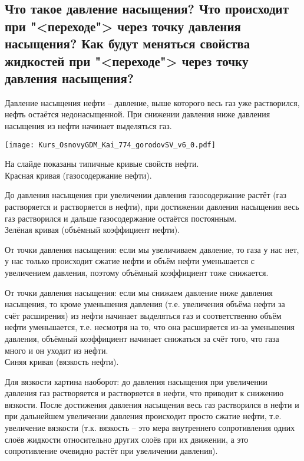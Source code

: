 

\subsection{Что такое давление насыщения? Что происходит при "<переходе"> через точку давления насыщения? Как будут меняться свойства жидкостей при "<переходе"> через  точку давления насыщения?}

Давление насыщения нефти -- давление, выше которого весь газ уже растворился, нефть остаётся недонасыщенной.
При снижении давления ниже давления насыщения из нефти начинает выделяться газ.

\texttt{[image: Kurs\_OsnovyGDM\_Kai\_774\_gorodovSV\_v6\_0.pdf]}

На слайде показаны типичные кривые свойств нефти.
\\

Красная кривая (газосодержание нефти).

До давления насыщения при увеличении давления газосодержание растёт (газ растворяется и растворяется в нефти), при достижении давления насыщения весь газ растворился и дальше газосодержание остаётся постоянным.
\\

Зелёная кривая (объёмный коэффициент нефти).

От точки давления насыщения: если мы увеличиваем давление, то газа у нас нет, у нас только происходит сжатие нефти и объём нефти уменьшается с увеличением давления, поэтому объёмный коэффициент тоже снижается.

От точки давления насыщения: если мы снижаем давление ниже давления насыщения, то кроме уменьшения давления (т.е. увеличения объёма нефти за счёт расширения) из нефти начинает выделяться газ и соответственно объём нефти уменьшается, т.е. несмотря на то, что она расширяется из-за уменьшения давления, объёмный коэффициент начинает снижаться за счёт того, что газа много и он уходит из нефти.
\\

Синяя кривая (вязкость нефти).

Для вязкости картина наоборот: до давления насыщения при увеличении давления газ растворяется и растворяется в нефти, что приводит к снижению вязкости.
После достижения давления насыщения весь газ растворился в нефти и при дальнейшем увеличении давления происходит просто сжатие нефти, т.е. увеличение вязкости (т.к. вязкость -- это мера внутреннего сопротивления одних слоёв жидкости относительно других слоёв при их движении, а это сопротивление очевидно растёт при увеличении давления).


